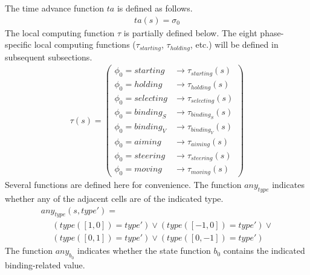 \documentclass{acm_proc_article-sp}
\begin{document}
The time advance function $ta$ is defined as follows.
\begin{displaymath} \begin{array}{l}
ta(s) = \sigma_0
\end{array} \end{displaymath}
The local computing function $\tau$ is partially defined below.  The
eight phase-specific local computing functions ($\tau_{starting}$, 
$\tau_{holding}$, etc.) will be defined in subsequent subsections.
\begin{displaymath} \begin{array}{l}
\tau(s) = \left( \begin{array}{ll} \phi_0 = starting  & \rightarrow \tau_{starting}(s) \\
                                   \phi_0 = holding   & \rightarrow \tau_{holding}(s) \\
                                   \phi_0 = selecting & \rightarrow \tau_{selecting}(s) \\
                                   \phi_0 = binding_S & \rightarrow \tau_{binding_S}(s) \\
                                   \phi_0 = binding_V & \rightarrow \tau_{binding_V}(s) \\
                                   \phi_0 = aiming    & \rightarrow \tau_{aiming}(s) \\
                                   \phi_0 = steering  & \rightarrow \tau_{steering}(s) \\
                                   \phi_0 = moving    & \rightarrow \tau_{moving}(s) \end{array} \right)
\end{array} \end{displaymath}
Several functions are defined here for convenience.  The function
$any_{type}$ indicates whether any of the adjacent cells are of the
indicated type.
\begin{displaymath} \begin{array}{l}
any_{type}(s, type') = \\
\hspace{16pt} (type([1, 0]) = type') \vee (type([-1, 0]) = type') \vee \\
\hspace{16pt} (type([0, 1]) = type') \vee (type([0, -1]) = type') 
\end{array} \end{displaymath}
The function $any_{b_0}$ indicates whether the state function $b_0$ 
contains the indicated binding-related value.
\end{document}
